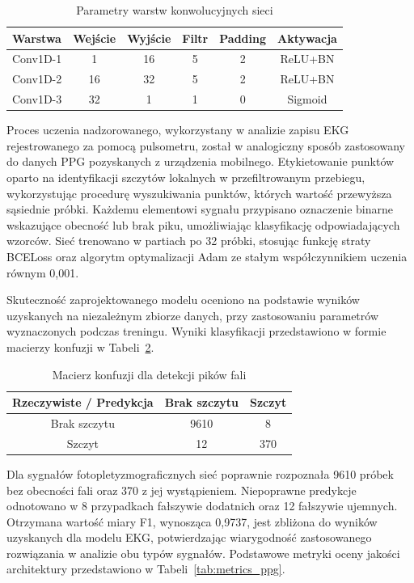\documentclass[journal]{IEEEtran}
\begin{document}
\begin{table}[ht]
\centering
\caption{Parametry warstw konwolucyjnych sieci}
\label{tab:ppg_layers}
\begin{tabular}{|l|c|c|c|c|c|}
\hline
\textbf{Warstwa} & \textbf{Wejście} & \textbf{Wyjście} & \textbf{Filtr} & \textbf{Padding} & \textbf{Aktywacja} \\
\hline
Conv1D-1 & 1 & 16 & 5 & 2 & ReLU+BN \\
Conv1D-2 & 16 & 32 & 5 & 2 & ReLU+BN \\
Conv1D-3 & 32 & 1 & 1 & 0 & Sigmoid \\
\hline
\end{tabular}
\end{table}

Proces uczenia nadzorowanego, wykorzystany w analizie zapisu EKG rejestrowanego za pomocą pulsometru, został w analogiczny sposób zastosowany do danych PPG pozyskanych z urządzenia mobilnego. Etykietowanie punktów oparto na identyfikacji szczytów lokalnych w przefiltrowanym przebiegu, wykorzystując procedurę wyszukiwania punktów, których wartość przewyższa sąsiednie próbki. Każdemu elementowi sygnału przypisano oznaczenie binarne wskazujące obecność lub brak piku, umożliwiając klasyfikację odpowiadających wzorców. Sieć trenowano w partiach po 32 próbki, stosując funkcję straty BCELoss oraz algorytm optymalizacji Adam ze stałym współczynnikiem uczenia równym 0,001.

Skuteczność zaprojektowanego modelu oceniono na podstawie wyników uzyskanych na niezależnym zbiorze danych, przy zastosowaniu parametrów wyznaczonych podczas treningu. Wyniki klasyfikacji przedstawiono w formie macierzy konfuzji w Tabeli~\ref{tab:conf_matrix_ppg}.

\begin{table}[ht]
\centering
\caption{Macierz konfuzji dla detekcji pików fali}
\label{tab:conf_matrix_ppg}
\begin{tabular}{|c|c|c|}
\hline
\textbf{Rzeczywiste / Predykcja} & \textbf{Brak szczytu } & \textbf{Szczyt} \\
\hline
Brak szczytu  & 9610 & 8 \\
\hline
Szczyt  & 12 & 370 \\
\hline
\end{tabular}
\end{table}

\newpage
Dla sygnałów fotopletyzmograficznych sieć poprawnie rozpoznała 9610 próbek bez obecności fali oraz 370 z jej wystąpieniem. Niepoprawne predykcje odnotowano w 8 przypadkach fałszywie dodatnich oraz 12  fałszywie ujemnych. Otrzymana wartość miary F1, wynosząca 0,9737, jest zbliżona do wyników uzyskanych dla modelu EKG, potwierdzając wiarygodność zastosowanego rozwiązania w analizie obu typów sygnałów.
Podstawowe metryki oceny jakości architektury przedstawiono w Tabeli~\ref{tab:metrics_ppg}.
\end{document}
